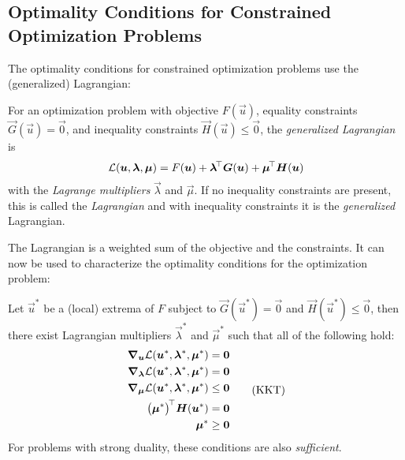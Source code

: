 		\subsection{Optimality Conditions for Constrained Optimization Problems} %
			The optimality conditions for constrained optimization problems use the (generalized) Lagrangian:
			\begin{definition}
				For an optimization problem with objective \(F(\vec{u})\), equality constraints \( \vec{G}(\vec{u}) = \vec{0} \), and inequality constraints \( \vec{H}(\vec{u}) \leq \vec{0} \), the \emph{generalized Lagrangian} is
				\begin{equation}
					\mathcal{L}(\bm{u}, \bm{\lambda}, \bm{\mu}) = F(\bm{u}) + \bm{\lambda}^{\!\top} \bm{G}(\bm{u}) + \bm{\mu}^{\!\top} \bm{H}(\bm{u})
				\end{equation}
				with the \emph{Lagrange multipliers} \(\vec{\lambda}\) and \(\vec{\mu}\). If no inequality constraints are present, this is called the \emph{Lagrangian} and with inequality constraints it is the \emph{generalized} Lagrangian.
			\end{definition}
			The Lagrangian is a weighted sum of the objective and the constraints. It can now be used to characterize the optimality conditions for the optimization problem:
			\begin{theorem}
				Let \(\vec{u}^\ast\) be a (local) extrema of \(F\) subject to \( \vec{G}(\vec{u}^\ast) = \vec{0} \) and \( \vec{H}(\vec{u}^\ast) \leq \vec{0} \), then there exist Lagrangian multipliers \( \vec{\lambda}^\ast \) and \( \vec{\mu}^\ast \) such that all of the following hold:
				\begin{equation}
					\begin{aligned}
						\grad_{\bm{u}} \mathcal{L}(\bm{u}^\ast, \bm{\lambda}^\ast, \bm{\mu}^\ast) &= \bm{0} \\
						\grad_{\bm{\lambda}} \mathcal{L}(\bm{u}^\ast, \bm{\lambda}^\ast, \bm{\mu}^\ast) &= \bm{0} \\
						\grad_{\bm{\mu}} \mathcal{L}(\bm{u}^\ast, \bm{\lambda}^\ast, \bm{\mu}^\ast) &\leq \bm{0} \\
						\bigl(\bm{\mu}^\ast\bigr)^{\!\top} \bm{H}(\bm{u}^\ast) &= \bm{0} \\
						\bm{\mu}^\ast &\geq \bm{0}
					\end{aligned}  \tag{KKT}\label{eqn:kkt}
				\end{equation}
				For problems with strong duality, these conditions are also \emph{sufficient}.
			\end{theorem}
